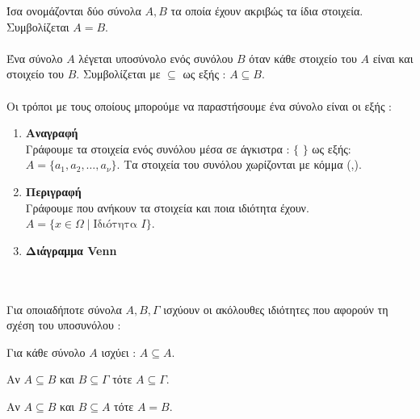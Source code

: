  Ίσα ονομάζονται δύο σύνολα $ A,B $ τα οποία έχουν ακριβώς τα ίδια στοιχεία. Συμβολίζεται $ A=B $.\\\\
 Ένα σύνολο $ A $ λέγεται υποσύνολο ενός συνόλου $ B $ όταν κάθε στοιχείο του $ A $ είναι και στοιχείο του $ B $. Συμβολίζεται με $ \subseteq $ ως εξής : $ A\subseteq B $.\\\\
Οι τρόποι με τους οποίους μπορούμε να παραστήσουμε ένα σύνολο είναι οι εξής :
\begin{enumerate}[label=\bf\arabic*.]
\item \textbf{Αναγραφή}\\
Γράφουμε τα στοιχεία ενός συνόλου μέσα σε άγκιστρα : $ \{\,\,\} $ ως εξής: $ A=\{a_1,a_2,\ldots,a_\nu\} $.
Τα στοιχεία του συνόλου χωρίζονται με κόμμα (,).
\item \textbf{Περιγραφή}\\
Γράφουμε που ανήκουν τα στοιχεία και ποια ιδιότητα έχουν. $ A=\{x\in\varOmega\;|\;\textrm{Ιδιότητα }I\} $.
\item \textbf{Διάγραμμα Venn}\\
\mbox{}\\
\end{enumerate}\mbox{}\\
\thewrhmata
{}
Για οποιαδήποτε σύνολα $ A,B,\varGamma $ ισχύουν οι ακόλουθες ιδιότητες που αφορούν τη σχέση του υποσυνόλου :
\begin{rlist}
\item Για κάθε σύνολο $ A $ ισχύει : $ A\subseteq A $.
\item Αν $ A\subseteq B $ και $ B\subseteq \varGamma $ τότε $ A\subseteq \varGamma $.
\item Αν $ A\subseteq B $ και $ B\subseteq A $ τότε $ A=B $.
\end{rlist}
